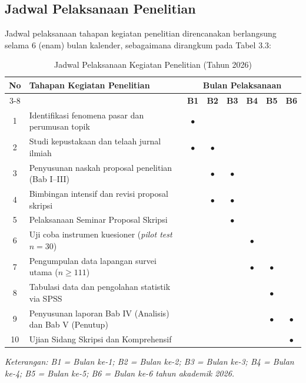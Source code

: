 \documentclass[12pt,a4paper]{article}
\numberwithin{equation}{section}
\numberwithin{table}{section}
\numberwithin{figure}{section}
\begin{document}
\subsection{Jadwal Pelaksanaan Penelitian}

Jadwal pelaksanaan tahapan kegiatan penelitian direncanakan berlangsung selama 6 (enam) bulan kalender, sebagaimana dirangkum pada Tabel 3.3:

\begin{table}[H]
\centering
\caption{Jadwal Pelaksanaan Kegiatan Penelitian (Tahun 2026)}
\label{tab:jadwal_penelitian}
\begin{tabularx}{\textwidth}{c X cccccc}
\toprule
\multirow{2}{*}{\textbf{No}} & \multirow{2}{*}{\textbf{Tahapan Kegiatan Penelitian}} & \multicolumn{6}{c}{\textbf{Bulan Pelaksanaan}} \\
\cmidrule(lr){3-8}
& & \textbf{B1} & \textbf{B2} & \textbf{B3} & \textbf{B4} & \textbf{B5} & \textbf{B6} \\
\midrule
1 & Identifikasi fenomena pasar dan perumusan topik & $\bullet$ & & & & & \\
2 & Studi kepustakaan dan telaah jurnal ilmiah & $\bullet$ & $\bullet$ & & & & \\
3 & Penyusunan naskah proposal penelitian (Bab I--III) & & $\bullet$ & $\bullet$ & & & \\
4 & Bimbingan intensif dan revisi proposal skripsi & & $\bullet$ & $\bullet$ & & & \\
5 & Pelaksanaan Seminar Proposal Skripsi & & & $\bullet$ & & & \\
6 & Uji coba instrumen kuesioner (\emph{pilot test} $n=30$) & & & & $\bullet$ & & \\
7 & Pengumpulan data lapangan survei utama ($n \ge 111$) & & & & $\bullet$ & $\bullet$ & \\
8 & Tabulasi data dan pengolahan statistik via SPSS & & & & & $\bullet$ & \\
9 & Penyusunan laporan Bab IV (Analisis) dan Bab V (Penutup) & & & & & $\bullet$ & $\bullet$ \\
10 & Ujian Sidang Skripsi dan Komprehensif & & & & & & $\bullet$ \\
\bottomrule
\end{tabularx}
\begin{flushleft}
  \footnotesize\textit{Keterangan: B1 = Bulan ke-1; B2 = Bulan ke-2; B3 = Bulan ke-3; B4 = Bulan ke-4; B5 = Bulan ke-5; B6 = Bulan ke-6 tahun akademik 2026.}
\end{flushleft}
\end{table}

\newpage
\renewcommand{\refname}{DAFTAR PUSTAKA}
{}

\end{document}
